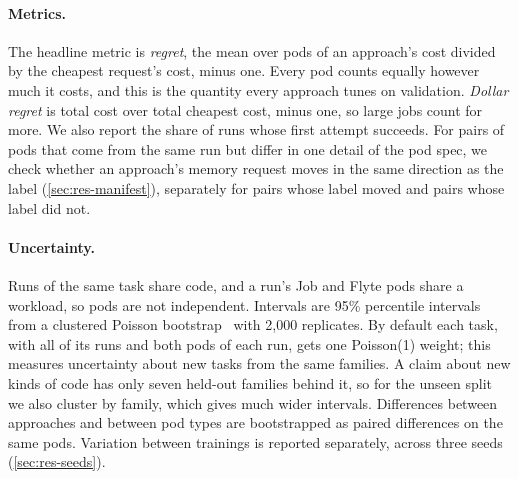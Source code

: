 \paragraph{Metrics.}
The headline metric is \emph{regret}, the mean over pods of an approach's cost divided by the cheapest
request's cost, minus one. Every pod counts equally however much it costs, and this is the quantity every
approach tunes on validation. \emph{Dollar regret} is total cost over total cheapest cost, minus one, so large
jobs count for more. We also report the share of runs whose first attempt succeeds. For pairs of pods that come
from the same run but differ in one detail of the pod spec, we check whether an approach's memory request moves
in the same direction as the label (\cref{sec:res-manifest}), separately for pairs whose label moved and pairs
whose label did not.

\paragraph{Uncertainty.}
Runs of the same task share code, and a run's Job and Flyte pods share a workload, so pods are not independent.
Intervals are 95\% percentile intervals from a clustered Poisson bootstrap~\citep{efron1993bootstrap,field2007clustered}
with 2,000 replicates. By default each task, with all of its runs and both pods of each run, gets one Poisson(1)
weight; this measures uncertainty about new tasks from the same families. A claim about new kinds of code has
only seven held-out families behind it, so for the unseen split we also cluster by family, which gives much
wider intervals. Differences between approaches and between pod types are bootstrapped as paired differences on
the same pods. Variation between trainings is reported separately, across three seeds (\cref{sec:res-seeds}).
